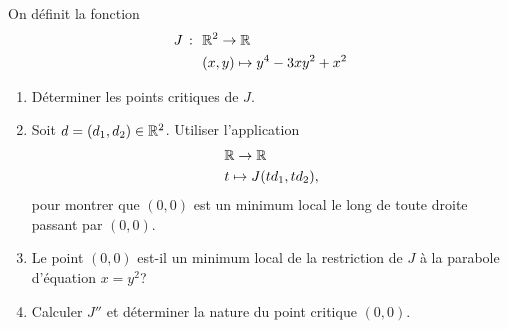 \begin{td-exo}
    On définit la fonction 
    \begin{equation*}
        \begin{aligned}
            J\ \colon\  &\mathbb{R}^2 \to \mathbb{R} \\
            &(x,y) \mapsto y^4 - 3xy^2 + x^2
        \end{aligned}
    \end{equation*}
    \begin{enumerate}[label=(\alph*)] %
        \item Déterminer les points critiques de \(J\).

        \item Soit \(d = (d_1, d_2)\in\mathbb{R}^2\). Utiliser l'application
        \begin{equation*}
            \begin{aligned}
                &\mathbb{R}\to \mathbb{R}\\
                &t \mapsto J(t d_1, t d_2),
            \end{aligned}
        \end{equation*}
        pour montrer que \((0, 0)\) est un minimum local le long de toute droite passant par \((0, 0)\).

        \item Le point \((0, 0)\) est-il un minimum local de la restriction de \(J\)
        à la parabole d'équation \(x = y^2\)?

        \item Calculer \(J''\) et déterminer la nature du point critique \((0, 0)\).
    \end{enumerate}
\end{td-exo}
